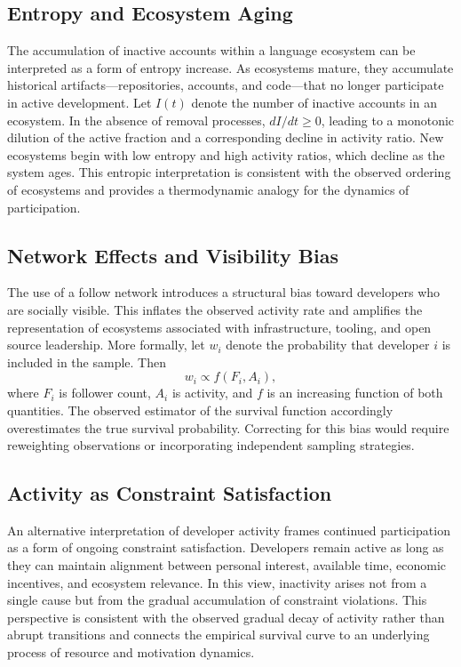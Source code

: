 \documentclass[12pt,a4paper]{article}
\begin{document}
\subsection{Entropy and Ecosystem Aging}

The accumulation of inactive accounts within a language ecosystem can be interpreted as a form of entropy increase. As ecosystems mature, they accumulate historical artifacts---repositories, accounts, and code---that no longer participate in active development. Let $I(t)$ denote the number of inactive accounts in an ecosystem. In the absence of removal processes, $dI/dt \geq 0$, leading to a monotonic dilution of the active fraction and a corresponding decline in activity ratio. New ecosystems begin with low entropy and high activity ratios, which decline as the system ages. This entropic interpretation is consistent with the observed ordering of ecosystems and provides a thermodynamic analogy for the dynamics of participation.

\subsection{Network Effects and Visibility Bias}

The use of a follow network introduces a structural bias toward developers who are socially visible. This inflates the observed activity rate and amplifies the representation of ecosystems associated with infrastructure, tooling, and open source leadership. More formally, let $w_i$ denote the probability that developer $i$ is included in the sample. Then
\[
w_i \propto f(F_i, A_i),
\]
where $F_i$ is follower count, $A_i$ is activity, and $f$ is an increasing function of both quantities. The observed estimator of the survival function accordingly overestimates the true survival probability. Correcting for this bias would require reweighting observations or incorporating independent sampling strategies.

\subsection{Activity as Constraint Satisfaction}

An alternative interpretation of developer activity frames continued participation as a form of ongoing constraint satisfaction. Developers remain active as long as they can maintain alignment between personal interest, available time, economic incentives, and ecosystem relevance. In this view, inactivity arises not from a single cause but from the gradual accumulation of constraint violations. This perspective is consistent with the observed gradual decay of activity rather than abrupt transitions and connects the empirical survival curve to an underlying process of resource and motivation dynamics.
\end{document}
